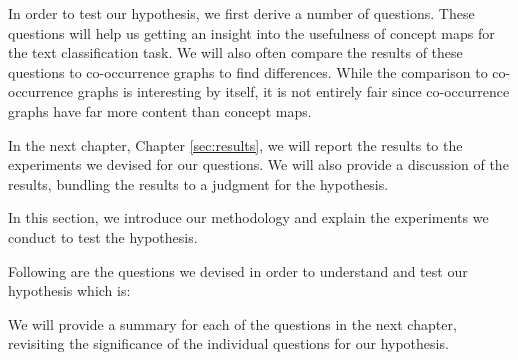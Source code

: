 In order to test our hypothesis, we first derive a number of questions.
These questions will help us getting an insight into the usefulness of concept maps for the text classification task.
We will also often compare the results of these questions to co-occurrence graphs to find differences. While the comparison to co-occurrence graphs is interesting by itself, it is not entirely fair since co-occurrence graphs have far more content than concept maps.

In the next chapter, Chapter \ref{sec:results}, we will report the results to the experiments we devised for our questions.
We will also provide a discussion of the results, bundling the results to a judgment for the hypothesis.

In this section, we introduce our methodology and explain the experiments we conduct to test the hypothesis.

Following are the questions we devised in order to understand and test our hypothesis which is:
\begin{quote}\hypothesis\end{quote}

We will provide a summary for each of the questions in the next chapter, revisiting the significance of the individual questions for our hypothesis.










